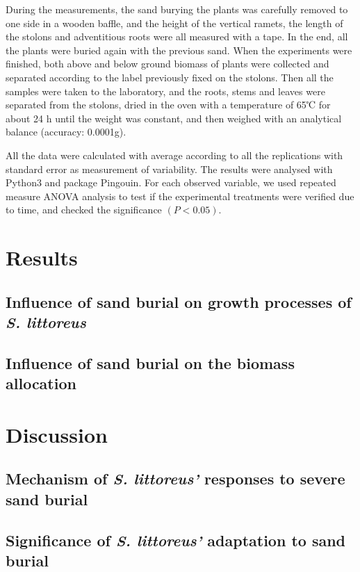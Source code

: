 \documentclass[]{interact}
\theoremstyle{plain}%
\theoremstyle{definition}
\theoremstyle{remark}
\begin{document}
During the measurements, the sand burying the plants was carefully removed to one side in a wooden baffle, and the height of the vertical ramets, the length of the stolons and adventitious roots were all measured with a tape. In the end, all the plants were buried again with the previous sand. When the experiments were finished, both above and below ground biomass of plants were collected and separated according to the label previously fixed on the stolons. Then all the samples were taken to the laboratory, and the roots, stems and leaves were separated from the stolons, dried in the oven with a temperature of 65℃ for about 24 h until the weight was constant, and then weighed with an analytical balance (accuracy: 0.0001g).

All the data were calculated with average according to all the replications with standard error as measurement of variability. The results were analysed with Python3 and package Pingouin. For each observed variable, we used repeated measure ANOVA analysis to test if the experimental treatments were verified due to time, and checked the significance $(P<0.05)$.

\section{Results}

\subsection{Influence of sand burial on growth processes of \textit{S. littoreus}}


\subsection{Influence of sand burial on the biomass allocation}


\section{Discussion}

\subsection{Mechanism of \textit{S. littoreus'} responses to severe sand burial}

\subsection{Significance of \textit{S. littoreus'} adaptation to sand burial}
\end{document}
